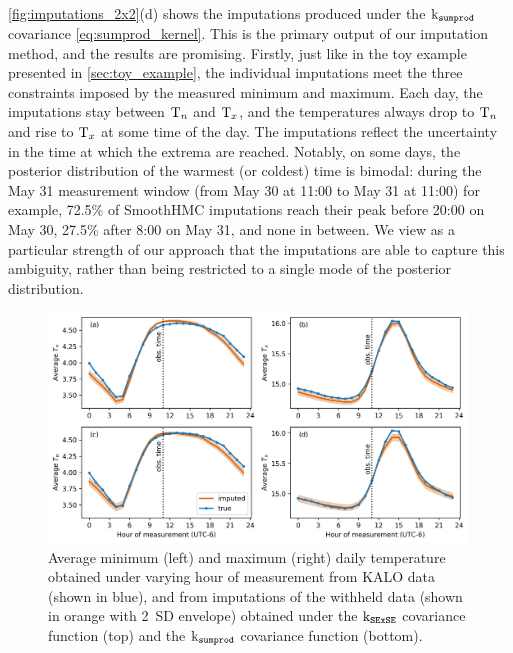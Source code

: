 \documentclass[12pt]{article}
\begin{document}
\autoref{fig:imputations_2x2}(d) shows the imputations produced under the \(\operatorname{k_{\mathtt{sumprod}}}\) covariance \autoref{eq:sumprod_kernel}.
This is the primary output of our imputation method, and the results are promising.
Firstly, just like in the toy example presented in \autoref{sec:toy_example}, the individual imputations meet the three constraints imposed by the measured minimum and maximum.
Each day, the imputations stay between \(\mathrm{T}_{n}\) and \(\mathrm{T}_{x}\),
and the temperatures always drop to \(\mathrm{T}_{n}\) and rise to \(\mathrm{T}_{x}\) at some time of the day.
The imputations reflect the uncertainty in the time at which the extrema are reached.
Notably, on some days, the posterior distribution of the warmest (or coldest) time is bimodal:
during the May 31 measurement window (from May 30 at 11:00 to May 31 at 11:00) for example, 72.5\% of SmoothHMC imputations reach their peak before 20:00 on May 30, 27.5\% after 8:00 on May 31, and none in between. 
We view as a particular strength of our approach that the imputations are able to capture this ambiguity, rather than being restricted to a single mode of the posterior distribution.

\begin{figure}[tbp]
\centering
\includegraphics[height=0.35\textheight,width=0.99\textwidth,keepaspectratio]{../figures/imputed_summary_stats.png}
\caption{\label{fig:imputed_summary_stats}
Average minimum (left) and maximum (right) daily temperature obtained under varying hour of measurement from KALO data (shown in blue), and from imputations of the withheld data (shown in orange with 2~SD envelope) obtained under the \(\operatorname{k_{\mathtt{SExSE}}}\) covariance function (top) and the \(\operatorname{k_{\mathtt{sumprod}}}\) covariance function (bottom).}
\end{figure}
    
\end{document}
